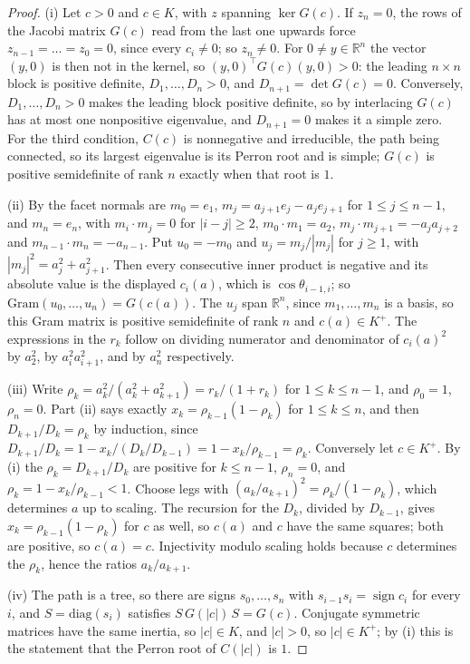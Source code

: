 \documentclass[11pt]{article}
\theoremstyle{definition}
\theoremstyle{remark}
\theoremstyle{definition}
\newcommand{\R}{\mathbb{R}}
\begin{document}
\begin{proof}
(i) Let $c>0$ and $c\in K$, with $z$ spanning $\ker G(c)$. If $z_n=0$, the rows of the Jacobi
matrix $G(c)$ read from the last one upwards force $z_{n-1}=\dots=z_0=0$, since every $c_i\ne0$;
so $z_n\ne0$. For $0\ne y\in\R^n$ the vector $(y,0)$ is then not in the kernel, so
$(y,0)^{\!\top}G(c)(y,0)>0$: the leading $n\times n$ block is positive definite, $D_1,\dots,D_n>0$,
and $D_{n+1}=\det G(c)=0$. Conversely, $D_1,\dots,D_n>0$ makes the leading block positive definite,
so by interlacing $G(c)$ has at most one nonpositive eigenvalue, and $D_{n+1}=0$ makes it a simple
zero. For the third condition, $C(c)$ is nonnegative and irreducible, the path being connected, so
its largest eigenvalue is its Perron root and is simple; $G(c)$ is positive semidefinite of rank $n$
exactly when that root is $1$.

(ii) By \cite[Lemma~\texttt{lem:normals}]{orthoscheme} the facet normals are $m_0=e_1$,
$m_j=a_{j+1}e_j-a_je_{j+1}$ for $1\le j\le n-1$, and $m_n=e_n$, with $m_i\cdot m_j=0$ for
$|i-j|\ge2$, $m_0\cdot m_1=a_2$, $m_j\cdot m_{j+1}=-a_ja_{j+2}$ and $m_{n-1}\cdot m_n=-a_{n-1}$.
Put $u_0=-m_0$ and $u_j=m_j/|m_j|$ for $j\ge1$, with $|m_j|^2=a_j^2+a_{j+1}^2$. Then every
consecutive inner product is negative and its absolute value is the displayed $c_i(a)$, which is
$\cos\theta_{i-1,i}$; so $\mathrm{Gram}(u_0,\dots,u_n)=G(c(a))$. The $u_j$ span $\R^n$, since
$m_1,\dots,m_n$ is a basis, so this Gram matrix is positive semidefinite of rank $n$ and
$c(a)\in K^+$. The expressions in the $r_k$ follow on dividing numerator and denominator of $c_i(a)^2$
by $a_2^2$, by $a_i^2a_{i+1}^2$, and by $a_n^2$ respectively.

(iii) Write $\rho_k=a_k^2/(a_k^2+a_{k+1}^2)=r_k/(1+r_k)$ for $1\le k\le n-1$, and $\rho_0=1$,
$\rho_n=0$. Part (ii) says exactly $x_k=\rho_{k-1}(1-\rho_k)$ for $1\le k\le n$, and then
$D_{k+1}/D_k=\rho_k$ by induction, since
$D_{k+1}/D_k=1-x_k/(D_k/D_{k-1})=1-x_k/\rho_{k-1}=\rho_k$. Conversely let $c\in K^+$. By (i) the
$\rho_k=D_{k+1}/D_k$ are positive for $k\le n-1$, $\rho_n=0$, and $\rho_k=1-x_k/\rho_{k-1}<1$.
Choose legs with $(a_k/a_{k+1})^2=\rho_k/(1-\rho_k)$, which determines $a$ up to scaling. The
recursion for the $D_k$, divided by $D_{k-1}$, gives $x_k=\rho_{k-1}(1-\rho_k)$ for $c$ as well,
so $c(a)$ and $c$ have the same squares; both are positive, so $c(a)=c$. Injectivity modulo
scaling holds because $c$ determines the $\rho_k$, hence the ratios $a_k/a_{k+1}$.

(iv) The path is a tree, so there are signs $s_0,\dots,s_n$ with $s_{i-1}s_i=\operatorname{sign}c_i$
for every $i$, and $S=\mathrm{diag}(s_i)$ satisfies $S\,G(|c|)\,S=G(c)$. Conjugate symmetric
matrices have the same inertia, so $|c|\in K$, and $|c|>0$, so $|c|\in K^+$; by (i) this is the
statement that the Perron root of $C(|c|)$ is $1$.


\end{proof}
\end{document}
